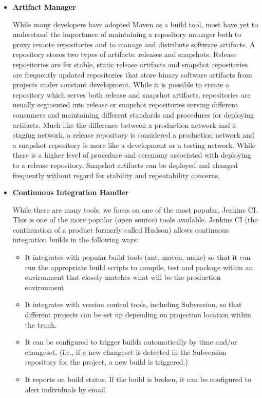 \documentclass[12pt,a4paper,oneside]{report}
\begin{document}
{\begin{itemize}
\par This practice advocates the use of a revision control system for the project's source code. All artifacts required to build the project should be placed in the repository. In this practice and in the revision control community, the convention is that the system should be buildable from a fresh checkout and not require additional dependencies.  Extreme Programming  mentions that where branching is supported by tools, its use should be minimised. Instead, it is preferred for changes to be integrated rather than for multiple versions of the software to be maintained simultaneously. 
\item \textbf{Artifact Manager}
\par 
While many developers have adopted Maven as a build tool, most have yet to understand the importance of maintaining a repository manager both to proxy remote repositories and to manage and distribute software artifacts. A repository stores two types of artifacts: releases and snapshots. Release repositories are for stable, static release artifacts and snapshot repositories are frequently updated repositories that store binary software artifacts from projects under constant development. While it is possible to create a repository which serves both release and snapshot artifacts, repositories are usually segmented into release or snapshot repositories serving different consumers and maintaining different standards and procedures for deploying artifacts. Much like the difference between a production network and a staging network, a release repository is considered a production network and a snapshot repository is more like a development or a testing network. While there is a higher level of procedure and ceremony associated with deploying to a release repository. Snapshot artifacts can be deployed and changed frequently without regard for stability and repeatability concerns.
\item \textbf{Continuous Integration Handler}
\par While there are many tools, we focus on one of the most popular, Jenkins CI. This is one of the more popular (open source) tools available. Jenkins CI (the continuation of a product formerly called Hudson) allows continuous integration builds in the following ways:
\begin{itemize}
\item It integrates with popular build tools (ant, maven, make) so that it can run the appropriate build scripts to compile, test and package within an environment that closely matches what will be the production environment
\item It integrates with version control tools, including Subversion, so that different projects can be set up depending on projection location within the trunk.
\item It can be configured to trigger builds automatically by time and/or changeset. (i.e., if a new changeset is detected in the Subversion repository for the project, a new build is triggered.)
\item It reports on build status. If the build is broken, it can be configured to alert individuals by email.
\end{itemize}



\end{itemize}}
\end{document}
